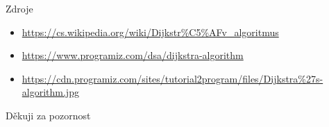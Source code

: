 \documentclass[czech]{beamer}
\begin{document}
\begin{frame}{Zdroje}
    \begin{itemize}
        \item \url{https://cs.wikipedia.org/wiki/Dijkstr\%C5\%AFv_algoritmus}
        \item \url{https://www.programiz.com/dsa/dijkstra-algorithm}
        \item \url{https://cdn.programiz.com/sites/tutorial2program/files/Dijkstra\%27s-algorithm.jpg}
    \end{itemize}
    
\end{frame}

\begin{frame}
    \huge{\centerline{Děkuji za pozornost}}
\end{frame}
\end{document}
